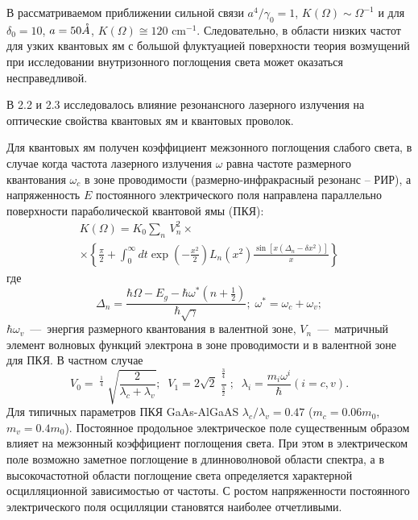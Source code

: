В рассматриваемом приближении сильной связи $a^4 /\gamma_0 =1$, $K(\Omega )\sim \Omega ^{-1} $ и для $\delta_0 =10$, $a=50 \AA$, $K(\Omega )\cong 120 \text{ cm}^{-1} $. Следовательно, в области низких частот для узких квантовых ям с большой флуктуацией поверхности теория возмущений при исследовании внутризонного поглощения света может оказаться несправедливой.

В 2.2 и 2.3 исследовалось влияние резонансного лазерного излучения на оптические свойства квантовых ям и квантовых проволок.

Для квантовых ям получен коэффициент межзонного поглощения слабого света, в случае когда частота лазерного излучения $\omega $ равна частоте размерного квантования $\omega_c $ в зоне проводимости (размерно-инфракрасный резонанс -- РИР), а напряженность $E$ постоянного электрического поля направлена параллельно поверхности параболической квантовой ямы (ПКЯ): 
\begin{multline} \label{eq:syn_11} 
K(\Omega )=K_0 \sum _{n} \, V_n^2 \times  \\
\times \left\{\frac{\pi }{2} +\int_0^{\infty } dt \exp \left(-\frac{x^2 }{2} \right)L_n \left(x^2 \right)\frac{\sin \left[x\left(\Delta_n -\delta x^2 \right)\right]}{x} \right\}
\end{multline} 
где 
\[\Delta_n =\frac{\hbar \Omega -E_g -\hbar \omega^* \left(n+{\tfrac{1}{2}} \right)}{\hbar \sqrt{\gamma } } ; \; \omega^* =\omega_c +\omega_v ;\] 
$\hbar \omega_v $~---~энергия размерного квантования в валентной зоне, $V_n $~---~матричный элемент волновых функций электрона в зоне проводимости и в валентной зоне для ПКЯ. В частном случае 
\[V_0 =\mathop{\left(\lambda_c \lambda_v \right)}\nolimits^{{\tfrac{1}{4}} } \sqrt{\frac{2}{\lambda_c +\lambda_v } } ;\; \; V_1 =2\sqrt{2} \frac{\mathop{\left(\lambda_c \lambda_v \right)}\nolimits^{{\tfrac{3}{4}} } }{\mathop{\left(\lambda_c +\lambda_v \right)}\nolimits^{{\tfrac{3}{2}} } } ;\; \; \lambda_i =\frac{m_i \omega^i }{\hbar } (i=c,v).\] 
Для типичных параметров ПКЯ GaAs-AlGaAS $\lambda_c /\lambda_v =0.47$ ($m_c =0.06m_0 ,$ $m_v =0.4m_0 $). Постоянное продольное электрическое поле существенным образом влияет на межзонный коэффициент поглощения света. При этом в электрическом поле возможно заметное поглощение в длинноволновой области спектра, а в высокочастотной области поглощение света определяется характерной осцилляционной зависимостью от частоты. С ростом напряженности постоянного электрического поля осцилляции становятся наиболее отчетливыми.

